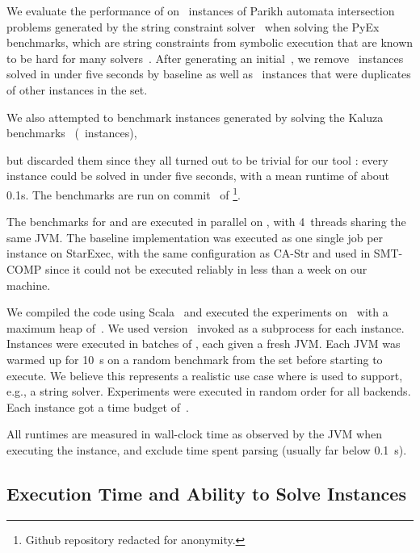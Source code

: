 
We evaluate the performance of \Catra{} on~\NrBenchmarks{} instances of Parikh
automata intersection problems generated by the \OstrichPlus{} string constraint
solver~\cite{ostrich-plus} when solving the PyEx benchmarks, 
which are string constraints from symbolic execution that are known
to be hard for many solvers~\cite{pyex}. After generating an
initial~\InitialNrBenchmarks{}, we remove~\NrTrivial{} instances solved in under
five seconds by baseline as well as~\NrInvalid{} instances that were duplicates of other instances in the set.

 We also attempted to benchmark instances generated by
\OstrichPlus{} solving the Kaluza benchmarks~\cite{Saxena10:kaluza}
(~instances),

but discarded them since they all turned out to be trivial for our tool
\Catra{}: every instance
could be solved in under five seconds, with a mean runtime of about 0.1s.
The benchmarks are run
on commit~\texttt{\commit} of \Catra{}\footnote{Github repository redacted for anonymity.}.

The benchmarks for \Calculus{} and \Nuxmv{} are executed in parallel on \BenchmarkRig{}, with 4~threads
sharing the same JVM.  The baseline implementation was executed as one single job per
instance on StarExec, with the same configuration as CA-Str and \Ostrich{} used in SMT-COMP since
it could not be executed reliably in less than a week on our machine.

We compiled
the code using Scala~\ScalaVersion{} and executed the experiments
on~\JvmVersion{} with a maximum heap of~\MaxHeapSize{}. We used \Nuxmv{}
version~\NuxmvVersion{} invoked as a subprocess for each instance. Instances
were executed in batches of \BatchSize{}, each given a fresh JVM. Each JVM was
warmed up for \SI{10}{s} on a random benchmark from the set before starting
to execute. We believe this represents a realistic use case where \Calculus{} is
used to support, e.g., a string solver. Experiments were executed in random order
for all backends. Each instance got a time budget of~\RuntimeTimeout{}.

All runtimes are measured in wall-clock time as observed by the JVM when
executing the instance, and exclude time spent parsing (usually far below
\SI{0.1}{s}).

\subsection{Execution Time and Ability to Solve Instances}\label{sec:runtime}

